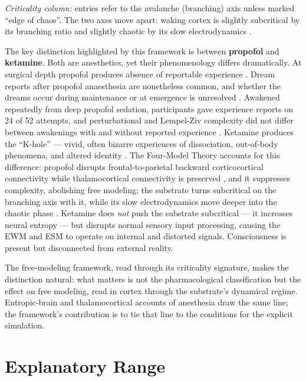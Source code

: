 \documentclass[12pt]{article}
\begin{document}
\emph{Criticality column:} entries refer to the avalanche (branching) axis unless marked ``edge of chaos''. The two axes move apart: waking cortex is slightly subcritical by its branching ratio \citep{Priesemann2014} and slightly chaotic by its slow electrodynamics \citep{Toker2022}.

The key distinction highlighted by this framework is between \textbf{propofol} and \textbf{ketamine}. Both are anesthetics, yet their phenomenology differs dramatically. At surgical depth propofol produces absence of reportable experience \citep{AlkireHudetzTononi2008,Boly2012}. Dream reports after propofol anaesthesia are nonetheless common, and whether the dreams occur during maintenance or at emergence is unresolved \citep{Sikka2026}. Awakened repeatedly from deep propofol sedation, participants gave experience reports on 24 of 52 attempts, and perturbational and Lempel-Ziv complexity did not differ between awakenings with and without reported experience \citep{Bajwa2025}. Ketamine produces the ``K-hole'' --- vivid, often bizarre experiences of dissociation, out-of-body phenomena, and altered identity \citep{Corlett2011}. The Four-Model Theory accounts for this difference: propofol disrupts frontal-to-parietal backward corticocortical connectivity while thalamocortical connectivity is preserved \citep{Boly2012}, and it suppresses complexity, abolishing free modeling; the substrate turns subcritical on the branching axis with it, while its slow electrodynamics move deeper into the chaotic phase \citep{Toker2022}. Ketamine does \emph{not} push the substrate subcritical --- it increases neural entropy \citep{Schartner2017} --- but disrupts normal sensory input processing, causing the EWM and ESM to operate on internal and distorted signals. Consciousness is present but disconnected from external reality.

The free-modeling framework, read through its criticality signature, makes the distinction natural: what matters is not the pharmacological classification but the effect on free modeling, read in cortex through the substrate's dynamical regime. Entropic-brain and thalamocortical accounts of anesthesia draw the same line; the framework's contribution is to tie that line to the conditions for the explicit simulation.



\section{Explanatory Range}
\end{document}
